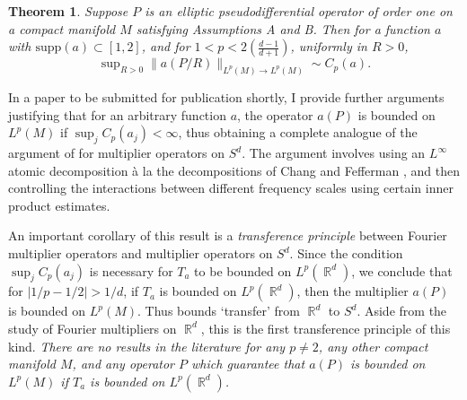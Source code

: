 \documentclass[11pt]{article}
\newtheorem*{theorem}{Theorem}
\DeclareMathOperator{\RR}{\mathbb{R}}
\begin{document}
\begin{theorem} \cite{DensonCharacterization}
	Suppose $P$ is an elliptic pseudodifferential operator of order one on a compact manifold $M$ satisfying Assumptions A and B. Then for a function $a$ with $\text{supp}(a) \subset [1,2]$, and for $1 < p < 2 ({\scriptstyle \frac{d-1}{d+1}})$, uniformly in $R > 0$,
    \[ \sup\nolimits_{R > 0} \| a(P/R) \|_{L^p(M) \to L^p(M)} \sim C_p(a). \]
\end{theorem}

In a paper to be submitted for publication shortly, I provide further arguments justifying that for an arbitrary function $a$, the operator $a(P)$ is bounded on $L^p(M)$ if $\sup_j C_p(a_j) < \infty$, thus obtaining a complete analogue of the argument of \cite{HeoNazarovSeeger} for multiplier operators on $S^d$. The argument involves using an $L^\infty$ atomic decomposition à la the decompositions of Chang and Fefferman \cite{ChangFefferman}, and then controlling the interactions between different frequency scales using certain inner product estimates. %

An important corollary of this result is a \emph{transference principle} between Fourier multiplier operators and multiplier operators on $S^d$. Since the condition $\sup_j C_p(a_j)$ is necessary for $T_a$ to be bounded on $L^p(\RR^d)$, we conclude that for $|1/p - 1/2| > 1/d$, if $T_a$ is bounded on $L^p(\RR^d)$, then the multiplier $a(P)$ is bounded on $L^p(M)$. Thus bounds `transfer' from $\RR^d$ to $S^d$. Aside from the study of Fourier multipliers on $\RR^d$, this is the first transference principle of this kind. \emph{There are no results in the literature for any $p \neq 2$, any other compact manifold $M$, and any operator $P$ which guarantee that $a(P)$ is bounded on $L^p(M)$ if $T_a$ is bounded on $L^p(\RR^d)$.}

\end{document}
